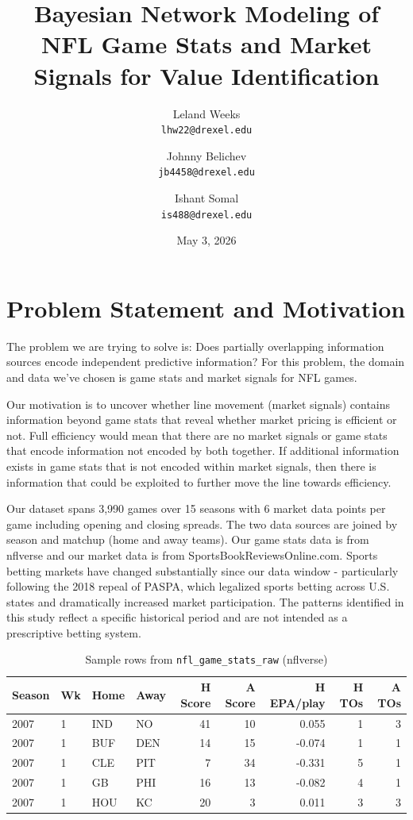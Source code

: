 \documentclass[letterpaper]{article}
\title{\textbf{Bayesian Network Modeling of NFL Game Stats and Market Signals for Value Identification}}
\author{
  Leland Weeks\\
  \texttt{lhw22@drexel.edu}
  \and
  Johnny Belichev\\
  \texttt{jb4458@drexel.edu}
  \and
  Ishant Somal\\
  \texttt{is488@drexel.edu}
}
\date{May 3, 2026}
\begin{document}
\maketitle


\section{Problem Statement and Motivation}

The problem we are trying to solve is: Does partially overlapping information sources encode independent predictive information? For this problem, the domain and data we've chosen is game stats and market signals for NFL games.

Our motivation is to uncover whether line movement (market signals) contains information beyond game stats that reveal whether market pricing is efficient or not. Full efficiency would mean that there are no market signals or game stats that encode information not encoded by both together. If additional information exists in game stats that is not encoded within market signals, then there is information that could be exploited to further move the line towards efficiency. 

Our dataset spans 3,990 games over 15 seasons with 6 market data points per game including opening and closing spreads. The two data sources are joined by season and matchup (home and away teams). Our game stats data is from nflverse\cite{nflverse} and our market data is from SportsBookReviewsOnline.com\cite{sbr}. Sports betting markets have changed substantially since our data window - particularly following the 2018 repeal of PASPA, which legalized sports betting across U.S. states and dramatically increased market participation. The patterns identified in this study reflect a specific historical period and are not intended as a prescriptive betting system.


\begin{table}[ht]
	\centering
	\small
	\caption{Sample rows from \texttt{nfl\_game\_stats\_raw} (nflverse)}
	\begin{tabular}{llllrrrrr}
		\hline
		\textbf{Season} & \textbf{Wk} & \textbf{Home} & \textbf{Away} & \textbf{H Score} & \textbf{A Score} & \textbf{H EPA/play} & \textbf{H TOs} & \textbf{A TOs} \\
		\hline
		2007 & 1 & IND & NO  & 41 & 10 &  0.055 & 1 & 3 \\
		2007 & 1 & BUF & DEN & 14 & 15 & -0.074 & 1 & 1 \\
		2007 & 1 & CLE & PIT &  7 & 34 & -0.331 & 5 & 1 \\
		2007 & 1 & GB  & PHI & 16 & 13 & -0.082 & 4 & 1 \\
		2007 & 1 & HOU & KC  & 20 &  3 &  0.011 & 3 & 3 \\
		\hline
	\end{tabular}
	\label{tab:nflverse}
\end{table}
\end{document}
